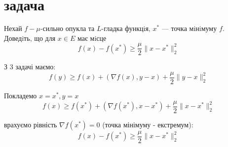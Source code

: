 \section{задача}

\begin{tcolorbox}[title=Умова]
    Нехай $f - \mu$-сильно опукла та $L$-гладка функцiя, $x^*$ — точка мiнiмуму $f$. Доведiть, що для $x \in E$ має мiсце
    $$ f(x) - f(x^*) \geq \frac{\mu}{2} \|x - x^*\|_2^2 $$
\end{tcolorbox}

З 3 задачі маємо:
$$ f(y) \geq f(x) + (\nabla f(x), y - x) + \frac{\mu}{2} \|y - x\|_2^2 $$

Покладемо $x=x^*, y = x$ 
$$ f(x) \geq f(x^*) + (\nabla f(x^*), x - x^*) + \frac{\mu}{2} \|x - x^*\|_2^2 $$


врахуємо рівність $\nabla f(x^*)=0$ (точка мінімуму - екстремум):
$$ f(x) - f(x^*) \geq \frac{\mu}{2} \|x - x^*\|_2^2 $$

